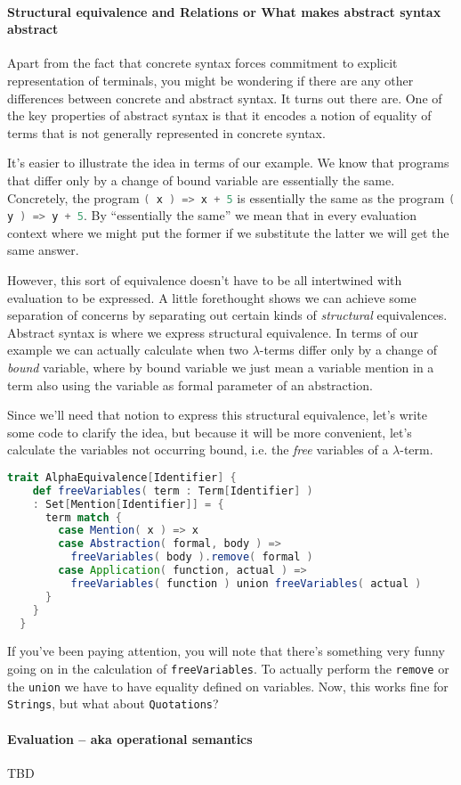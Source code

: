 \paragraph{Structural equivalence and Relations or What makes abstract syntax abstract}

Apart from the fact that concrete syntax forces commitment to explicit
representation of terminals, you might be wondering if there are any
other differences between concrete and abstract syntax. It turns out
there are. One of the key properties of abstract syntax is that it
encodes a notion of equality of terms that is not generally
represented in concrete syntax.

It's easier to illustrate the idea in terms of our example. We know
that programs that differ only by a change of bound variable are
essentially the same. Concretely, the program
\lstinline[language=Scala]!( x ) => x + 5! is essentially the same as
the program \lstinline[language=Scala]!( y ) => y + 5!. By
``essentially the same'' we mean that in every evaluation context
where we might put the former if we substitute the latter we will get
the same answer. 

However, this sort of equivalence doesn't have to be all intertwined
with evaluation to be expressed. A little forethought shows we can
achieve some separation of concerns by separating out certain kinds of
\emph{structural} equivalences. Abstract syntax is where we express
structural equivalence. In terms of our example we can actually
calculate when two $\lambda$-terms differ only by a change of
\emph{bound} variable, where by bound variable we just mean a variable
mention in a term also using the variable as formal parameter of an
abstraction. 

Since we'll need that notion to express this structural equivalence,
let's write some code to clarify the idea, but because it will be more
convenient, let's calculate the variables not occurring bound,
i.e. the \emph{free} variables of a $\lambda$-term.

\begin{lstlisting}[language=Scala]
  trait AlphaEquivalence[Identifier] {
    def freeVariables( term : Term[Identifier] )
    : Set[Mention[Identifier]] = {
      term match {
        case Mention( x ) => x
        case Abstraction( formal, body ) =>
          freeVariables( body ).remove( formal )
        case Application( function, actual ) =>
          freeVariables( function ) union freeVariables( actual )
      }
    }
  }
\end{lstlisting}

If you've been paying attention, you will note that there's something
very funny going on in the calculation of
\lstinline[language=Scala]!freeVariables!. To actually perform the
\lstinline[language=Scala]!remove! or the
\lstinline[language=Scala]!union! we have to have equality defined on
variables. Now, this works fine for
\lstinline[language=Scala]!Strings!, but what about
\lstinline[language=Scala]!Quotations!?

\paragraph{Evaluation -- aka operational semantics}

TBD
